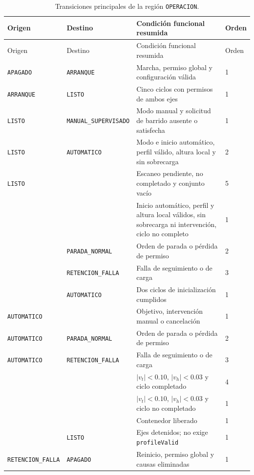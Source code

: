 \documentclass[a4paper,10pt,onecolumn,journal]{ieeeconf}
\numberwithin{equation}{section}
\begin{document}
{\footnotesize
\begin{longtable}{L{3.5cm} L{3.5cm} L{6.4cm} C{1.0cm}}
\caption{Transiciones principales de la región \texttt{OPERACION}.}\label{tab:transiciones_operacion}\\
\toprule
Origen & Destino & Condición funcional resumida & Orden\\
\midrule
\endfirsthead
\toprule
Origen & Destino & Condición funcional resumida & Orden\\
\midrule
\endhead
\texttt{APAGADO} & \texttt{ARRANQUE} & Marcha, permiso global y configuración válida & 1\\
\texttt{ARRANQUE} & \texttt{LISTO} & Cinco ciclos con permisos de ambos ejes & 1\\
\texttt{LISTO} & \texttt{MANUAL\_SUPERVISADO} & Modo manual y solicitud de barrido ausente o satisfecha & 1\\
\texttt{LISTO} & \texttt{AUTOMATICO} & Modo e inicio automático, perfil válido, altura local y sin sobrecarga & 2\\
\texttt{LISTO} &  & Escaneo pendiente, no completado y conjunto vacío & 5\\
 &  & Inicio automático, perfil y altura local válidos, sin sobrecarga ni intervención, ciclo no completo & 1\\
 & \texttt{PARADA\_NORMAL} & Orden de parada o pérdida de permiso & 2\\
 & \texttt{RETENCION\_FALLA} & Falla de seguimiento o de carga & 3\\
 & \texttt{AUTOMATICO} & Dos ciclos de inicialización cumplidos & 1\\
\texttt{AUTOMATICO} &  & Objetivo, intervención manual o cancelación & 1\\
\texttt{AUTOMATICO} & \texttt{PARADA\_NORMAL} & Orden de parada o pérdida de permiso & 2\\
\texttt{AUTOMATICO} & \texttt{RETENCION\_FALLA} & Falla de seguimiento o de carga & 3\\
 &  & $|v_t|<0.10$, $|v_h|<0.03$ y ciclo completado & 4\\
 &  & $|v_t|<0.10$, $|v_h|<0.03$ y ciclo no completado & 1\\
 &  & Contenedor liberado & 1\\
 & \texttt{LISTO} & Ejes detenidos; no exige \texttt{profileValid} & 1\\
\texttt{RETENCION\_FALLA} & \texttt{APAGADO} & Reinicio, permiso global y causas eliminadas & 1\\
\bottomrule
\end{longtable}
}
\end{document}
